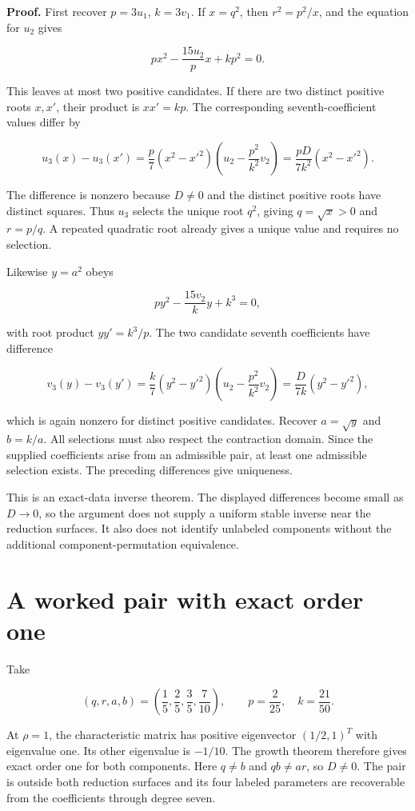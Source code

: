 \textbf{Proof.} First recover \(p=3u_1\), \(k=3v_1\). If \(x=q^2\), then
\(r^2=p^2/x\), and the equation for \(u_2\) gives

\[
p x^2-\frac{15u_2}{p}x+kp^2=0.
\]

This leaves at most two positive candidates. If there are two distinct
positive roots \(x,x'\), their product is \(xx'=kp\). The corresponding
seventh-coefficient values differ by

\[
u_3(x)-u_3(x')
=\frac p7(x^2-x'^2)
\left(u_2-\frac{p^2}{k^2}v_2\right)
=\frac{pD}{7k^2}(x^2-x'^2).
\]

The difference is nonzero because \(D\ne0\) and the distinct positive
roots have distinct squares. Thus \(u_3\) selects the unique root
\(q^2\), giving \(q=\sqrt{x}>0\) and \(r=p/q\). A repeated quadratic
root already gives a unique value and requires no selection.

Likewise \(y=a^2\) obeys

\[
p y^2-\frac{15v_2}{k}y+k^3=0,
\]

with root product \(yy'=k^3/p\). The two candidate seventh coefficients
have difference

\[
v_3(y)-v_3(y')
=\frac k7(y^2-y'^2)
\left(u_2-\frac{p^2}{k^2}v_2\right)
=\frac{D}{7k}(y^2-y'^2),
\]

which is again nonzero for distinct positive candidates. Recover
\(a=\sqrt{y}\) and \(b=k/a\). All selections must also respect the
contraction domain. Since the supplied coefficients arise from an
admissible pair, at least one admissible selection exists. The preceding
differences give uniqueness.

This is an exact-data inverse theorem. The displayed differences become
small as \(D\to0\), so the argument does not supply a uniform stable
inverse near the reduction surfaces. It also does not identify unlabeled
components without the additional component-permutation equivalence.

\hypertarget{v11-coupled_inverse_full-a-worked-pair-with-exact-order-one}{%
\section{A worked pair with exact order
one}\label{v11-coupled_inverse_full-a-worked-pair-with-exact-order-one}}

Take

\[
(q,r,a,b)=\left(\frac15,\frac25,\frac35,\frac7{10}\right),\qquad
p=\frac2{25},\quad k=\frac{21}{50}.
\]

At \(\rho=1\), the characteristic matrix has positive eigenvector
\((1/2,1)^T\) with eigenvalue one. Its other eigenvalue is \(-1/10\).
The growth theorem therefore gives exact order one for both components.
Here \(q\ne b\) and \(qb\ne ar\), so \(D\ne0\). The pair is outside both
reduction surfaces and its four labeled parameters are recoverable from
the coefficients through degree seven.

